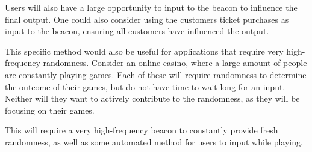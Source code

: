 Users will also have a large opportunity to input to the beacon to influence the final output. One could also consider using the customers ticket purchases as input to the beacon, ensuring all customers have influenced the output.

This specific method would also be useful for applications that require very high-frequency randomness. Consider an online casino, where a large amount of people are constantly playing games. Each of these will require randomness to determine the outcome of their games, but do not have time to wait long for an input. Neither will they want to actively contribute to the randomness, as they will be focusing on their games.

This will require a very high-frequency beacon to constantly provide fresh randomness, as well as some automated method for users to input while playing.